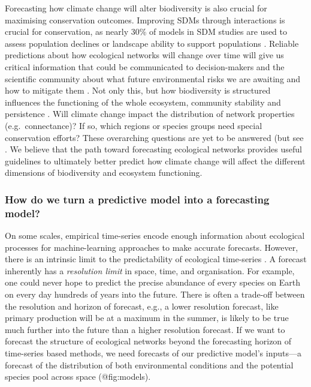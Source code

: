 Forecasting how climate change will alter biodiversity is also crucial
for maximising conservation outcomes. Improving SDMs through
interactions is crucial for conservation, as nearly 30\% of models in
SDM studies are used to assess population declines or landscape ability
to support populations \cite{Araujo2019StaDis}. Reliable predictions
about how ecological networks will change over time will give us
critical information that could be communicated to decision-makers and
the scientific community about what future environmental risks we are
awaiting and how to mitigate them \cite{Kindsvater2018OveDat}. Not only
this, but how biodiversity is structured influences the functioning of
the whole ecosystem, community stability and persistence
\cite{Thompson2012FooWeb, Stouffer2010UndFoo}. Will climate change
impact the distribution of network properties (e.g.~connectance)? If so,
which regions or species groups need special conservation efforts? These
overarching questions are yet to be answered (but see
\cite{Albouy2013ProCli, Kortsch2015CliCha, Hattab2016ForFin}. We believe
that the path toward forecasting ecological networks provides useful
guidelines to ultimately better predict how climate change will affect
the different dimensions of biodiversity and ecosystem functioning.

\subsubsection{How do we turn a predictive model into a forecasting
model?}\label{how-do-we-turn-a-predictive-model-into-a-forecasting-model}

On some scales, empirical time-series encode enough information about
ecological processes for machine-learning approaches to make accurate
forecasts. However, there is an intrinsic limit to the predictability of
ecological time-series \cite{Pennekamp2019IntPre}. A forecast inherently
has a \emph{resolution limit} in space, time, and organisation. For
example, one could never hope to predict the precise abundance of every
species on Earth on every day hundreds of years into the future. There
is often a trade-off between the resolution and horizon of forecast,
e.g., a lower resolution forecast, like primary production will be at a
maximum in the summer, is likely to be true much further into the future
than a higher resolution forecast. If we want to forecast the structure
of ecological networks beyond the forecasting horizon of time-series
based methods, we need forecasts of our predictive model's inputs---a
forecast of the distribution of both environmental conditions and the
potential species pool across space (@fig:models).

